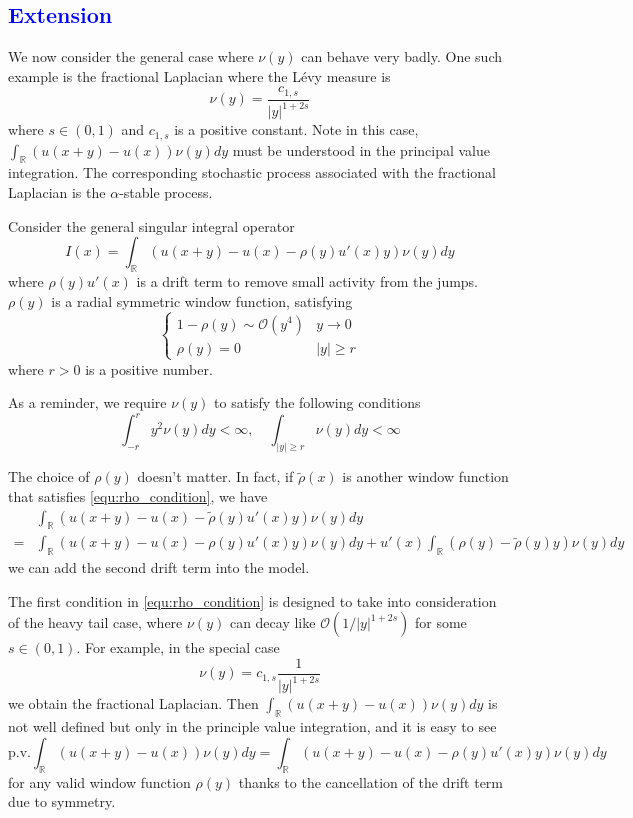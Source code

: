 \documentclass[10pt,a4paper]{article}
\newcommand{\RR}[0]{\mathbb{R}}
\newcommand{\lib}[1]{\textcolor{blue}{\section{#1}}}
\theoremstyle{definition}
\begin{document}
\lib{Extension}

We now consider the general case where $\nu(y)$ can behave very badly. One such example is the fractional Laplacian where the L\'evy measure is 
\begin{equation}
	\nu(y) = \frac{c_{1,s}}{|y|^{1+2s}}
\end{equation}
where $s\in (0,1)$ and $c_{1,s}$ is a positive constant. Note in this case, $\int_{\RR}(u(x+y)-u(x))\nu(y)dy$ must be understood in the principal value integration. The corresponding stochastic process associated with the fractional Laplacian is the $\alpha$-stable process. 

Consider the general singular integral operator
\begin{equation}\label{equ:Ix}
	I(x) = \int_{\RR}(u(x+y)-u(x)-\rho(y)u'(x)y)\nu(y)dy
\end{equation}
where $\rho(y)u'(x)$ is a drift term to remove small activity from the jumps. $\rho(y)$ is a radial symmetric window function, satisfying
\begin{equation}\label{equ:rho_condition}
\begin{cases}
	1-\rho(y)\sim \mathcal{O}(y^4)& y\rightarrow 0\\
	\rho(y)=0 & |y|\geq r
\end{cases}
\end{equation}
where $r>0$ is a positive number. 

As a reminder, we require $\nu(y)$ to satisfy the following conditions
\begin{equation}\label{equ:ny}
	\int_{-r}^ry^2\nu(y)dy <\infty, \quad \int_{|y|\geq r} \nu(y)dy<\infty
\end{equation} 

The choice of $\rho(y)$ doesn't matter. In fact, if $\tilde\rho(x)$ is another window function that satisfies \cref{equ:rho_condition}, we have
\begin{align}
	&\int_{\RR}(u(x+y)-u(x)-\tilde\rho(y)u'(x)y)\nu(y)dy \\
	=& \int_{\RR}(u(x+y)-u(x)-\rho(y)u'(x)y)\nu(y)dy + u'(x)\int_{\RR}(\rho(y)-\tilde\rho(y)y)\nu(y)dy
\end{align}
we can add the second drift term into the model. 

The first condition in \cref{equ:rho_condition} is designed to take into consideration of the heavy tail case, where $\nu(y)$ can decay like $\mathcal{O}(1/|y|^{1+2s})$ for some $s\in (0,1)$. For example, in the special case
\begin{equation}
	\nu(y) = c_{1,s}\frac{1}{|y|^{1+2s}}
\end{equation}
we obtain the fractional Laplacian. Then $\int_{\RR}(u(x+y)-u(x))\nu(y)dy$ is not well defined but only in the principle value integration, and it is easy to see
\begin{equation}
	\mathrm{p.v.}\int_{\RR}(u(x+y)-u(x))\nu(y)dy = \int_{\RR}(u(x+y)-u(x)-\rho(y)u'(x)y)\nu(y)dy
\end{equation}
for any valid window function $\rho(y)$ thanks to the cancellation of the drift term due to symmetry. 
\end{document}
